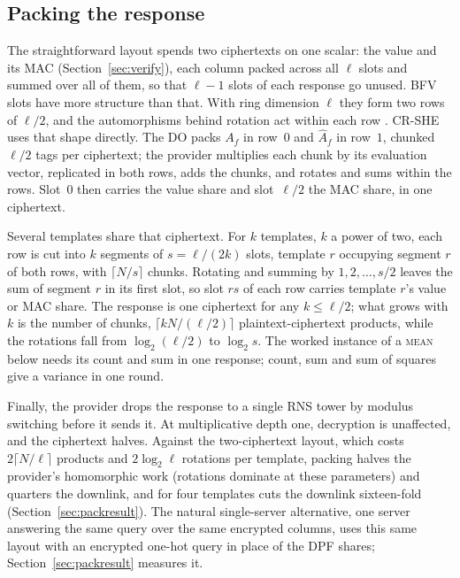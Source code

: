 \documentclass[a4paper,fleqn]{cas-sc}
\begin{document}
\subsection{Packing the response}
\label{sec:packing}
The straightforward layout spends two ciphertexts on one scalar: the value and its MAC
(Section~\ref{sec:verify}), each column packed across all $\ell$ slots and
summed over all of them, so that $\ell-1$ slots of each response go unused.
BFV slots have more structure than that. With ring dimension $\ell$ they form
two rows of $\ell/2$, and the automorphisms behind rotation act within each row
\citep{halevi2014algorithms}. CR-SHE uses that shape directly. The DO packs
$A_f$ in row~$0$ and $\widehat{A}_f$ in row~$1$, chunked $\ell/2$ tags per
ciphertext; the provider multiplies each chunk by its evaluation vector,
replicated in both rows, adds the chunks, and rotates and sums within the rows.
Slot~$0$ then carries the value share and slot~$\ell/2$ the MAC share, in one
ciphertext.

Several templates share that ciphertext. For $k$ templates, $k$ a power of
two, each row is cut into $k$ segments of $s=\ell/(2k)$ slots, template $r$
occupying segment $r$ of both rows, with $\lceil N/s\rceil$ chunks. Rotating
and summing by $1,2,\dots,s/2$ leaves the sum of segment $r$ in its first slot,
so slot $rs$ of each row carries template $r$'s value or MAC share. The
response is one ciphertext for any $k\le\ell/2$; what grows with $k$ is the
number of chunks, $\lceil kN/(\ell/2)\rceil$ plaintext-ciphertext products,
while the rotations fall from $\log_2(\ell/2)$ to $\log_2 s$. The worked
instance of a \textsc{mean} below needs its count and sum in one response;
count, sum and sum of squares give a variance in one round.

Finally, the provider drops the response to a single RNS tower by modulus
switching before it sends it. At multiplicative depth one, decryption is
unaffected, and the ciphertext halves. Against the two-ciphertext layout, which
costs $2\lceil N/\ell\rceil$ products and $2\log_2\ell$ rotations per template,
packing halves the provider's homomorphic work (rotations dominate at these
parameters) and quarters the downlink, and for four templates cuts the
downlink sixteen-fold (Section~\ref{sec:packresult}). The natural single-server
alternative, one server answering the same query over the same encrypted
columns, uses this same layout with an encrypted one-hot
query in place of the DPF shares; Section~\ref{sec:packresult} measures it.
\end{document}
